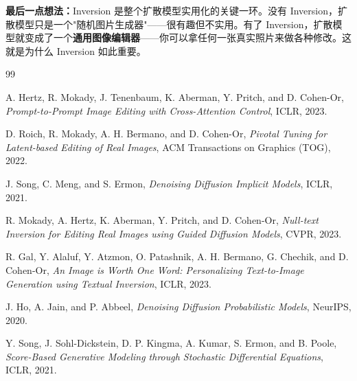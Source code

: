 \documentclass[11pt,a4paper]{article}
\theoremstyle{definition}
\begin{document}
\textbf{最后一点想法：}Inversion 是整个扩散模型实用化的关键一环。没有 Inversion，扩散模型只是一个"随机图片生成器"——很有趣但不实用。有了 Inversion，扩散模型就变成了一个\textbf{通用图像编辑器}——你可以拿任何一张真实照片来做各种修改。这就是为什么 Inversion 如此重要。


\begin{thebibliography}{99}

A. Hertz, R. Mokady, J. Tenenbaum, K. Aberman, Y. Pritch, and D. Cohen-Or,
\textit{Prompt-to-Prompt Image Editing with Cross-Attention Control},
ICLR, 2023.

D. Roich, R. Mokady, A. H. Bermano, and D. Cohen-Or,
\textit{Pivotal Tuning for Latent-based Editing of Real Images},
ACM Transactions on Graphics (TOG), 2022.

J. Song, C. Meng, and S. Ermon,
\textit{Denoising Diffusion Implicit Models},
ICLR, 2021.

R. Mokady, A. Hertz, K. Aberman, Y. Pritch, and D. Cohen-Or,
\textit{Null-text Inversion for Editing Real Images using Guided Diffusion Models},
CVPR, 2023.

R. Gal, Y. Alaluf, Y. Atzmon, O. Patashnik, A. H. Bermano, G. Chechik, and D. Cohen-Or,
\textit{An Image is Worth One Word: Personalizing Text-to-Image Generation using Textual Inversion},
ICLR, 2023.

J. Ho, A. Jain, and P. Abbeel,
\textit{Denoising Diffusion Probabilistic Models},
NeurIPS, 2020.

Y. Song, J. Sohl-Dickstein, D. P. Kingma, A. Kumar, S. Ermon, and B. Poole,
\textit{Score-Based Generative Modeling through Stochastic Differential Equations},
ICLR, 2021.

\end{thebibliography}
\end{document}
